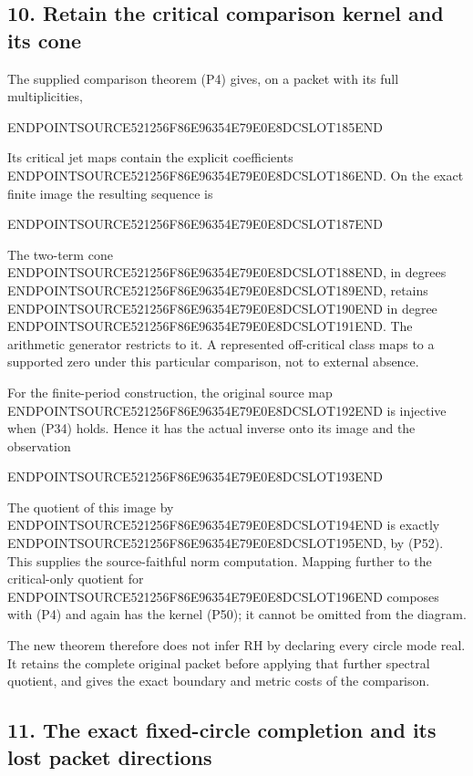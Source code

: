 \subsection{10. Retain the critical comparison kernel and its cone}\label{endpoint-periodized_original--retain-the-critical-comparison-kernel-and-its-cone}

The supplied comparison theorem (P4) gives, on a packet with its full multiplicities,

ENDPOINTSOURCE521256F86E96354E79E0E8DCSLOT185END

Its critical jet maps contain the explicit coefficients ENDPOINTSOURCE521256F86E96354E79E0E8DCSLOT186END. On the exact finite image the resulting sequence is

ENDPOINTSOURCE521256F86E96354E79E0E8DCSLOT187END

The two-term cone ENDPOINTSOURCE521256F86E96354E79E0E8DCSLOT188END, in degrees ENDPOINTSOURCE521256F86E96354E79E0E8DCSLOT189END, retains ENDPOINTSOURCE521256F86E96354E79E0E8DCSLOT190END in degree ENDPOINTSOURCE521256F86E96354E79E0E8DCSLOT191END. The arithmetic generator restricts to it. A represented off-critical class maps to a supported zero under this particular comparison, not to external absence.

For the finite-period construction, the original source map ENDPOINTSOURCE521256F86E96354E79E0E8DCSLOT192END is injective when (P34) holds. Hence it has the actual inverse onto its image and the observation

ENDPOINTSOURCE521256F86E96354E79E0E8DCSLOT193END

The quotient of this image by ENDPOINTSOURCE521256F86E96354E79E0E8DCSLOT194END is exactly ENDPOINTSOURCE521256F86E96354E79E0E8DCSLOT195END, by (P52). This supplies the source-faithful norm computation. Mapping further to the critical-only quotient for ENDPOINTSOURCE521256F86E96354E79E0E8DCSLOT196END composes with (P4) and again has the kernel (P50); it cannot be omitted from the diagram.

The new theorem therefore does not infer RH by declaring every circle mode real. It retains the complete original packet before applying that further spectral quotient, and gives the exact boundary and metric costs of the comparison.

\subsection{11. The exact fixed-circle completion and its lost packet directions}\label{endpoint-periodized_original--the-exact-fixed-circle-completion-and-its-lost-packet-directions}

